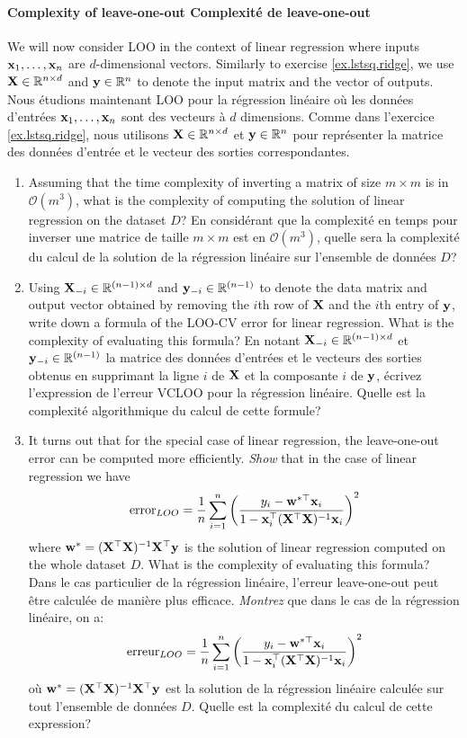 \documentclass[11pt,french,english]{article}
\newcommand{\french}[1]{ {\color{blue} #1} }
\renewcommand{\vec}[1]{{\bf #1}}
\newcommand{\mat}[1]{{\bf #1}}
\newcommand{\x}{\vec{x}}
\newcommand{\y}{\vec{y}}
\newcommand{\w}{\vec{w}}
\newcommand{\X}{\mat{X}}
\newcommand{\bigo}[1]{\mathcal{O}\left(#1\right)}
\begin{document}
\begin{enumerate}
\paragraph{Complexity of leave-one-out \french{Complexité de leave-one-out}}
We will now consider LOO in the context of linear regression where inputs $\x_1,\dots,\x_n$ are $d$-dimensional vectors. Similarly to exercise \ref{ex.lstsq.ridge}, we use $\X\in\mathbb{R}^{n\times d}$ and $\y\in\mathbb{R}^{n}$ to denote the input matrix and the vector of outputs. \french{Nous étudions maintenant LOO pour la régression linéaire où les données d'entrées $\x_1,\dots,\x_n$ sont des vecteurs à $d$ dimensions. Comme dans l'exercice \ref{ex.lstsq.ridge}, nous utilisons $\X\in\mathbb{R}^{n\times d}$ et $\y\in\mathbb{R}^{n}$ pour représenter la matrice des données d'entrée et le vecteur des sorties correspondantes.}
 \begin{enumerate}[resume]
     \item Assuming that the time complexity of inverting a matrix of size $m\times m$ is in $\bigo{m^3}$, what is the complexity of computing the solution of linear regression on the dataset $D$? \french{En considérant que la complexité en temps pour inverser une matrice de taille $m\times m$ est en $\bigo{m^3}$, quelle sera la complexité du calcul de la solution de la régression linéaire sur l'ensemble de données $D$?}
     \item Using $\X_{-i} \in \mathbb{R}^{(n-1)\times d}$ and $\y_{-i} \in \mathbb{R}^{(n-1)}$ to denote the data matrix and output vector obtained by removing the $i$th row of $\X$ and the $i$th entry of $\y$, write down a formula of the LOO-CV error for linear regression. What is the complexity of evaluating this formula? \french{En notant $\X_{-i} \in \mathbb{R}^{(n-1)\times d}$ et $\y_{-i} \in \mathbb{R}^{(n-1)}$ la matrice des données d'entrées et le vecteurs des sorties obtenus en supprimant la ligne $i$ de $\X$ et la composante $i$ de $\y$, écrivez l'expression de l'erreur VCLOO pour la régression linéaire. Quelle est la complexité algorithmique du calcul de cette formule?}
     \item \iftoggle{undergrad}{{\color{red} [bonus]}}{} It turns out that for the special case of linear regression, the leave-one-out error can be computed more efficiently.  \emph{Show} that in the case of linear regression we have
     $$ \mathrm{error}_{LOO} = \frac{1}{n}\sum_{i=1}^n \left(\frac{y_i - \w^{*\top}\x_i}{1-\x_i^\top(\X^\top\X)^{-1} \x_i}\right)^2$$
     where $\w^*=(\X^\top\X)^{-1}\X^\top\y$ is the solution of linear regression computed on the whole dataset $D$. What is the complexity of evaluating this formula? \french{Dans le cas particulier de la régression linéaire, l'erreur leave-one-out peut être calculée de manière plus efficace.  \emph{Montrez} que dans le cas de la régression linéaire, on a:
     $$ \mathrm{erreur}_{LOO} = \frac{1}{n}\sum_{i=1}^n \left(\frac{y_i - \w^{*\top}\x_i}{1-\x_i^\top(\X^\top\X)^{-1} \x_i}\right)^2$$
     où $\w^*=(\X^\top\X)^{-1}\X^\top\y$ est la solution de la régression linéaire calculée sur tout l'ensemble de données $D$. Quelle est la complexité du calcul de cette expression? }
 \end{enumerate}


\end{enumerate}
\end{document}
